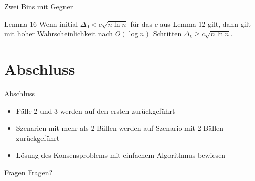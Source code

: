 \documentclass{beamer}
\begin{document}
    \begin{frame}{Zwei Bins mit Gegner}
        \begin{block}{Lemma 16}
            Wenn initial \(\Delta_0 < c\sqrt{n \ln n}\) für das \(c\) aus Lemma 12
            gilt, dann gilt mit hoher Wahrscheinlichkeit nach \(O(\log n)\)
            Schritten \(\Delta_t \geq c\sqrt{n \ln n}\).
        \end{block}
    \end{frame}

    \section{Abschluss}
    \begin{frame}{Abschluss}
        \begin{itemize}
            \item Fälle 2 und 3 werden auf den ersten zurückgeführt
            \vfill
            \item Szenarien mit mehr als 2 Bällen werden auf Szenario mit 2 Bällen
                  zurückgeführt
            \vfill
            \item Lösung des Konsensproblems mit einfachem Algorithmus bewiesen
        \end{itemize}
    \end{frame}

    \begin{frame}{Fragen}
        \centering
        Fragen?
    \end{frame}
\end{document}
